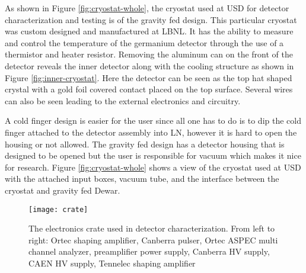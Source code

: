 As shown in Figure \ref{fig:cryostat-whole}, the cryostat used at USD for detector characterization and testing is of the gravity fed design.
This particular cryostat was custom designed and manufactured at LBNL.
It has the ability to measure and control the temperature of the germanium detector through the use of a thermistor and heater resistor.
Removing the aluminum can on the front of the detector reveals the inner detector along with the cooling structure as shown in Figure \ref{fig:inner-cryostat}.
Here the detector can be seen as the top hat shaped crystal with a gold foil covered contact placed on the top surface.
Several wires can also be seen leading to the external electronics and circuitry.

A cold finger design is easier for the user since all one has to do is to dip the cold finger attached to the detector assembly into LN, however it is hard to open the housing or not allowed.
The gravity fed design has a detector housing that is designed to be opened but the user is responsible for vacuum which makes it nice for research.
Figure \ref{fig:cryostat-whole} shows a view of the cryostat used at USD with the attached input boxes, vacuum tube, and the interface between the cryostat and gravity fed Dewar.
\begin{figure}[htpb]
\centering
\texttt{[image: crate]}
\caption{The electronics crate used in detector characterization. From left to right: Ortec shaping amplifier, Canberra pulser, Ortec ASPEC multi channel analyzer, preamplifier power supply, Canberra HV supply, CAEN HV supply, Tennelec shaping amplifier}
\label{fig:crate}
\end{figure}

